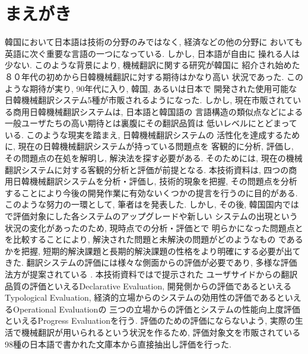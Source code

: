 

\maketitle


\section{まえがき}
韓国において日本語は技術の分野のみではなく, 経済などの他の分野に
おいても英語に次ぐ重要な言語の一つになっている. しかし, 日本語が自由に
操れる人は少ない. このような背景により, 機械翻訳に関する研究が韓国に
紹介され始めた８０年代の初めから日韓機械翻訳に対する期待はかなり高い
状況であった. このような期待が実り, 90年代に入り, 韓国, あるいは日本で
開発された使用可能な日韓機械翻訳システム5種が市販されるようになった. 
しかし, 現在市販されている商用日韓機械翻訳システムは, 日本語と韓国語の
言語構造の類似点などによる一般ユーザたちの高い期待とは裏腹にその翻訳品質は
低いレベルにとどまっている. このような現実を踏まえ, 日韓機械翻訳システムの
活性化を達成するために, 現在の日韓機械翻訳システムが持っている問題点を
客観的に分析, 評価し, その問題点の在処を解明し, 解決法を探す必要がある. 
そのためには, 現在の機械翻訳システムに対する客観的分析と評価が前提となる.  
本技術資料は, 四つの商用日韓機械翻訳システムを分析・評価し, 技術的現象を把握, 
その問題点を分析することにより今後の開発作業に有効ないくつかの提言を行うのに目的がある. 
このような努力の一環として, 筆者は\cite{choiandkim}を発表した. しかし, その後, 
韓国国内では\cite{choiandkim}で評価対象にした各システムのアップグレードや新しい
システムの出現という状況の変化があったのため, 現時点での分析・評価と\cite{choiandkim}で
明らかになった問題点とを比較することにより, 解決された問題と未解決の問題がどのようなもの
であるかを把握, 短期的解決課題と長期的解決課題の性格をより明確にする必要が出てきた. 
翻訳システムの評価には様々な側面からの評価が必要であり, 多様な評価法方が提案されている
\cite{dijk,White,Whiteandconnel,井佐原}. 本技術資料では\cite{arnold}で提示された
ユーザサイドからの翻訳品質の評価といえるDeclarative Evaluation, 開発側からの評価であるといえる
Typological Evaluation, 経済的立場からのシステムの効用性の評価であるといえるOperational Evaluationの
三つの立場からの評価とシステムの性能向上度評価といえるProgress Evaluationを行う. 
評価のための評価にならないよう, 実際の生活で機械翻訳が用いられるという状況を作るため, 
評価対象文を市販されている98種の日本語で書かれた文庫本から直接抽出し評価を行った. 


